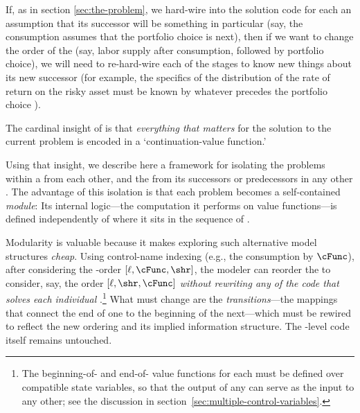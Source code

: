 \documentclass[titlepage, headings=optiontotocandhead]{econark}
\begin{document}
If, as in section \ref{sec:the-problem}, we hard-wire into the solution code for each {\stg} an assumption that its successor {\stg} will be something in particular (say, the consumption {\stg} assumes that the portfolio choice is next), then if we want to change the order of the {\stgs} (say, labor supply after consumption, followed by portfolio choice), we will need to re-hard-wire each of the stages to know new things about its new successor (for example, the specifics of the distribution of the rate of return on the risky asset must be known by whatever {\stg} precedes the portfolio choice {\stg}).

The cardinal insight of \citet{bellman1957} is that \emph{everything that matters} for the solution to the current problem is encoded in a `continuation-value function.'

Using that insight, we describe here a framework for isolating the {\stg} problems within a {\interval} from each other, and the {\interval} from its successors or predecessors in any other {\interval}.  The advantage of this isolation is that each {\stg} problem becomes a self-contained \textit{module}: Its internal logic---the computation it performs on value functions---is defined independently of where it sits in the sequence of {\stgs}.


Modularity is valuable because it makes exploring such alternative model structures \textit{cheap}.  Using control-name indexing (e.g., the consumption {\stg} by $\cFunc$), after considering the {\stg}-order $[\ell,\cFunc,\shr]$, the modeler can reorder the {\stgs} to consider, say, the order $[\ell,\shr,\cFunc]$ \textit{without rewriting any of the code that solves each individual {\stg}}.\footnote{The beginning-of-{\stg} and end-of-{\stg} value functions for each {\stg} must be defined over compatible state variables, so that the output of any {\stg} can serve as the input to any other; see the discussion in section~\ref{sec:multiple-control-variables}.
}  What must change are the \textit{transitions}---the mappings that connect the end of one {\stg} to the beginning of the next---which must be rewired to reflect the new ordering and its implied information structure.  The {\stg}-level code itself remains untouched.
\end{document}
